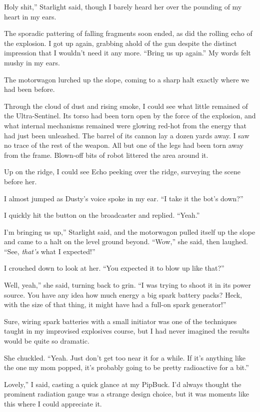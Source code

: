 \leavevmode{}Holy shit,” Starlight said, though I barely heard her over the pounding of my heart in my ears.

The sporadic pattering of falling fragments soon ended, as did the rolling echo of the explosion. I got up again, grabbing ahold of the gun despite the distinct impression that I wouldn’t need it any more. “Bring us up again.” My words felt mushy in my ears.

The motorwagon lurched up the slope, coming to a sharp halt exactly where we had been before.

Through the cloud of dust and rising smoke, I could see what little remained of the Ultra-Sentinel. Its torso had been torn open by the force of the explosion, and what internal mechanisms remained were glowing red-hot from the energy that had just been unleashed. The barrel of its cannon lay a dozen yards away. I saw no trace of the rest of the weapon. All but one of the legs had been torn away from the frame. Blown-off bits of robot littered the area around it.

Up on the ridge, I could see Echo peeking over the ridge, surveying the scene before her.

I almost jumped as Dusty’s voice spoke in my ear. “I take it the bot’s down?”

I quickly hit the button on the broadcaster and replied. “Yeah.”

\leavevmode{}I’m bringing us up,” Starlight said, and the motorwagon pulled itself up the slope and came to a halt on the level ground beyond. “Wow,” she said, then laughed. “See, \textit{that’s} what I expected!”

I crouched down to look at her. “You expected it to blow up like that?”

\leavevmode{}Well, yeah,” she said, turning back to grin. “I was trying to shoot it in its power source. You have any idea how much energy a big spark battery packs? Heck, with the size of that thing, it might have had a full-on spark generator!”

Sure, wiring spark batteries with a small initiator was one of the techniques taught in my improvised explosives course, but I had never imagined the results would be quite so dramatic.

She chuckled. “Yeah. Just don’t get too near it for a while. If it’s anything like the one my mom popped, it’s probably going to be pretty radioactive for a bit.”

\leavevmode{}Lovely,” I said, casting a quick glance at my PipBuck. I’d always thought the prominent radiation gauge was a strange design choice, but it was moments like this where I could appreciate it.

